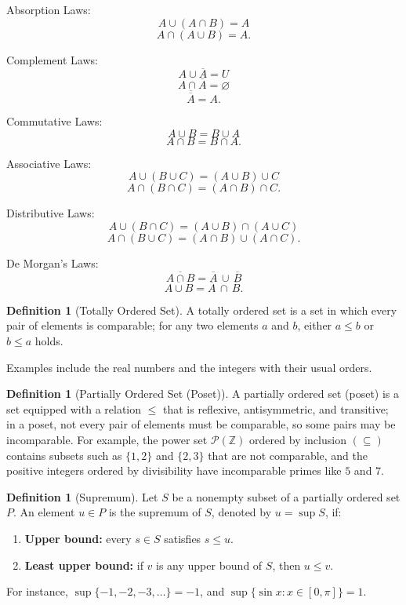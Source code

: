 \documentclass[12pt]{article}
\theoremstyle{definition}
\newtheorem{definition}[theorem]{Definition}
\begin{document}
Absorption Laws:
$$
A \cup (A \cap B) = A$$$$ A \cap (A \cup B) = A.
$$

Complement Laws:
$$
A \cup \overline{A} = U$$$$ A \cap \overline{A} = \varnothing$$$$ \overline{\overline{A}} = A.
$$

Commutative Laws:
$$
A \cup B = B \cup A$$$$ A \cap B = B \cap A.
$$

Associative Laws:
$$
A \cup (B \cup C) = (A \cup B)\cup C$$$$ A \cap (B \cap C) = (A \cap B)\cap C.
$$

Distributive Laws:
$$
A \cup (B \cap C) = (A \cup B)\cap (A \cup C)$$$$
A \cap (B \cup C) = (A \cap B)\cup (A \cap C).
$$

De Morgan's Laws:
$$
\overline{A \cap B}=\overline{A}\,\cup\,\overline{B}$$$$
\overline{A \cup B}=\overline{A}\,\cap\,\overline{B}.
$$


\begin{definition}[Totally Ordered Set]
A totally ordered set is a set in which every pair of elements is comparable; for any two elements $a$ and $b$, either $a \le b$ or $b \le a$ holds. 
\end{definition}

Examples include the real numbers and the integers with their usual orders.

\vspace{12pt}


\begin{definition}[Partially Ordered Set (Poset)]
A partially ordered set (poset) is a set equipped with a relation $\le$ that is reflexive, antisymmetric, and transitive; in a poset, not every pair of elements must be comparable, so some pairs may be incomparable. For example, the power set $\mathcal{P}(\mathbb{Z})$ ordered by inclusion $(\subseteq)$ contains subsets such as $\{1,2\}$ and $\{2,3\}$ that are not comparable, and the positive integers ordered by divisibility have incomparable primes like $5$ and $7$.
\end{definition}
\vspace{12pt}


\begin{definition}[Supremum]
Let $S$ be a nonempty subset of a partially ordered set $P$. An element $u \in P$ is the supremum of $S$, denoted by $u=\sup S$, if:
\begin{enumerate}
\item \textbf{Upper bound:} every $s\in S$ satisfies $s \le u$.
\item \textbf{Least upper bound:} if $v$ is any upper bound of $S$, then $u \le v$.
\end{enumerate}
For instance, $\sup\{-1,-2,-3,\dots\}=-1$, and $\sup\{\sin x: x\in[0,\pi]\}=1$.
\end{definition}
\vspace{12pt}
\end{document}
